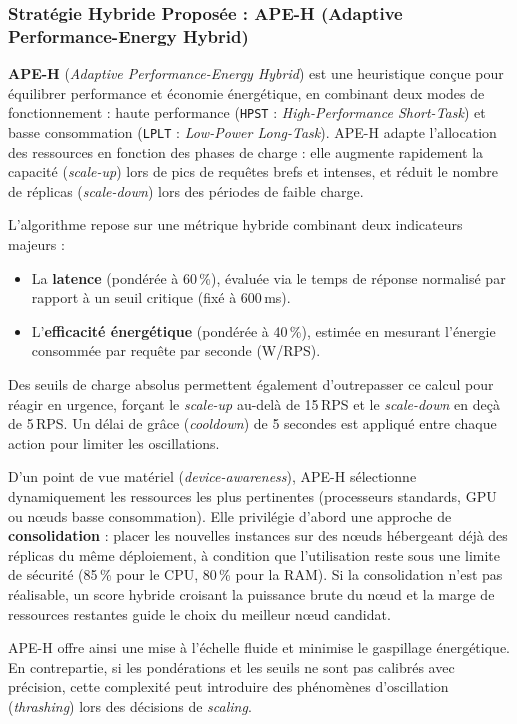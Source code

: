 \subsubsection{Stratégie Hybride Proposée : APE-H (Adaptive Performance-Energy Hybrid)}

\textbf{APE-H} (\textit{Adaptive Performance-Energy Hybrid}) est une heuristique conçue pour équilibrer performance et économie énergétique, en combinant deux modes de fonctionnement : haute performance (\texttt{HPST} : \textit{High-Performance Short-Task}) et basse consommation (\texttt{LPLT} : \textit{Low-Power Long-Task}). APE-H adapte l'allocation des ressources en fonction des phases de charge : elle augmente rapidement la capacité (\textit{scale-up}) lors de pics de requêtes brefs et intenses, et réduit le nombre de réplicas (\textit{scale-down}) lors des périodes de faible charge.

L'algorithme repose sur une métrique hybride combinant deux indicateurs majeurs :
\begin{itemize}
    \item La \textbf{latence} (pondérée à 60\,\%), évaluée via le temps de réponse normalisé par rapport à un seuil critique (fixé à 600\,ms).
    \item L'\textbf{efficacité énergétique} (pondérée à 40\,\%), estimée en mesurant l'énergie consommée par requête par seconde (W/RPS).
\end{itemize}

Des seuils de charge absolus permettent également d'outrepasser ce calcul pour réagir en urgence, forçant le \textit{scale-up} au-delà de 15\,RPS et le \textit{scale-down} en deçà de 5\,RPS. Un délai de grâce (\textit{cooldown}) de 5 secondes est appliqué entre chaque action pour limiter les oscillations.

D'un point de vue matériel (\textit{device-awareness}), APE-H sélectionne dynamiquement les ressources les plus pertinentes (processeurs standards, GPU ou nœuds basse consommation). Elle privilégie d'abord une approche de \textbf{consolidation} : placer les nouvelles instances sur des nœuds hébergeant déjà des réplicas du même déploiement, à condition que l'utilisation reste sous une limite de sécurité (85\,\% pour le CPU, 80\,\% pour la RAM). Si la consolidation n'est pas réalisable, un score hybride croisant la puissance brute du nœud et la marge de ressources restantes guide le choix du meilleur nœud candidat.

APE-H offre ainsi une mise à l'échelle fluide et minimise le gaspillage énergétique. En contrepartie, si les pondérations et les seuils ne sont pas calibrés avec précision, cette complexité peut introduire des phénomènes d'oscillation (\textit{thrashing}) lors des décisions de \textit{scaling}.

